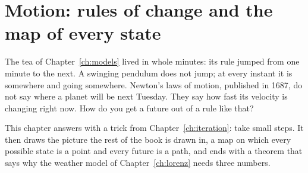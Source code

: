
\chapter{Motion: rules of change and the map of every state}
\label{ch:motion}

\noindent
The tea of Chapter~\ref{ch:models} lived in whole minutes: its rule jumped
from one minute to the next. A swinging pendulum does not jump; at every
instant it is somewhere and going somewhere. Newton's laws of motion,
published in 1687, do not say where a planet will be next Tuesday. They say
how fast its velocity is changing right now. How do you get a future out of
a rule like that?

This chapter answers with a trick from Chapter~\ref{ch:iteration}: take small
steps. It then draws the picture the rest of the book is drawn in, a map on
which every possible state is a point and every future is a path, and ends
with a theorem that says why the weather model of Chapter~\ref{ch:lorenz}
needs three numbers.

\begin{outcomes}
\end{outcomes}

